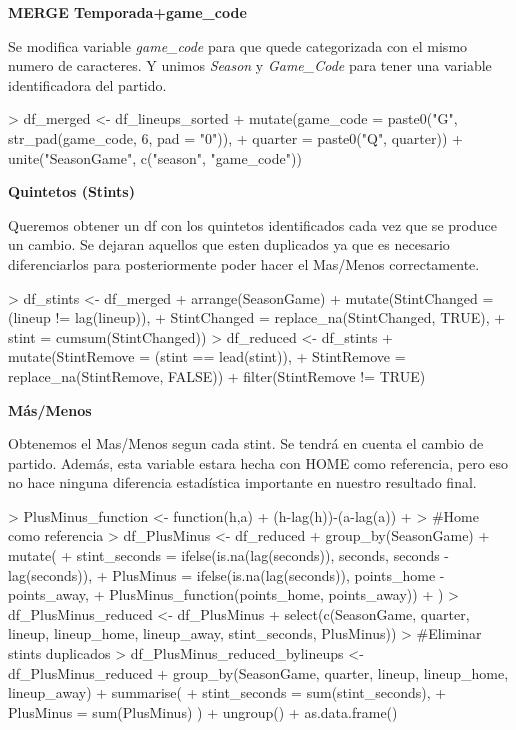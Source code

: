 \documentclass[paper=a4, fontsize=9pt]{article}
\begin{document}
\textbf{MERGE Temporada+game_code}

Se modifica variable \emph{game\_code} para que quede categorizada con el mismo numero de caracteres. Y unimos \emph{Season} y \emph{Game\_Code} para tener una variable identificadora del partido.

\begin{Schunk}
\begin{Sinput}
> df_merged <- df_lineups_sorted %
+   mutate(game_code = paste0("G", str_pad(game_code, 6, pad = "0")), 
+                      quarter   = paste0("Q", quarter)) %
+   unite("SeasonGame", c("season", "game_code"))
\end{Sinput}
\end{Schunk}

\textbf{Quintetos (Stints)}

Queremos obtener un df con los quintetos identificados cada vez que se produce un cambio. Se dejaran aquellos que esten duplicados ya que es necesario diferenciarlos para posteriormente poder hacer el Mas/Menos correctamente. 

\begin{Schunk}
\begin{Sinput}
> df_stints <- df_merged %
+   arrange(SeasonGame) %
+   mutate(StintChanged = (lineup != lag(lineup)),
+          StintChanged = replace_na(StintChanged, TRUE),
+          stint        = cumsum(StintChanged))
> df_reduced <- df_stints %
+   mutate(StintRemove  = (stint == lead(stint)),
+          StintRemove  = replace_na(StintRemove, FALSE)) %
+   filter(StintRemove != TRUE)
\end{Sinput}
\end{Schunk}

\textbf{Más/Menos}

Obtenemos el Mas/Menos segun cada stint. Se tendrá en cuenta el cambio de partido.
Además, esta variable estara hecha con HOME como referencia, pero eso no hace ninguna diferencia estadística importante en nuestro resultado final.


\begin{Schunk}
\begin{Sinput}
> PlusMinus_function <- function(h,a){
+   (h-lag(h))-(a-lag(a))
+ }
> #Home como referencia
> df_PlusMinus <- df_reduced %
+   group_by(SeasonGame) %
+   mutate(
+     stint_seconds = ifelse(is.na(lag(seconds)), seconds, seconds - lag(seconds)),
+     PlusMinus  = ifelse(is.na(lag(seconds)), points_home - points_away,
+                        PlusMinus_function(points_home, points_away))
+   ) %
> df_PlusMinus_reduced <- df_PlusMinus %
+   select(c(SeasonGame, quarter, lineup, lineup_home, lineup_away, stint_seconds, PlusMinus)) 
> #Eliminar stints duplicados
> df_PlusMinus_reduced_bylineups <- df_PlusMinus_reduced %
+   group_by(SeasonGame, quarter, lineup, lineup_home, lineup_away) %
+   summarise(
+     stint_seconds = sum(stint_seconds),
+     PlusMinus  = sum(PlusMinus) ) %
+   ungroup() %
+   as.data.frame()
\end{Sinput}
\end{Schunk}
\end{document}
